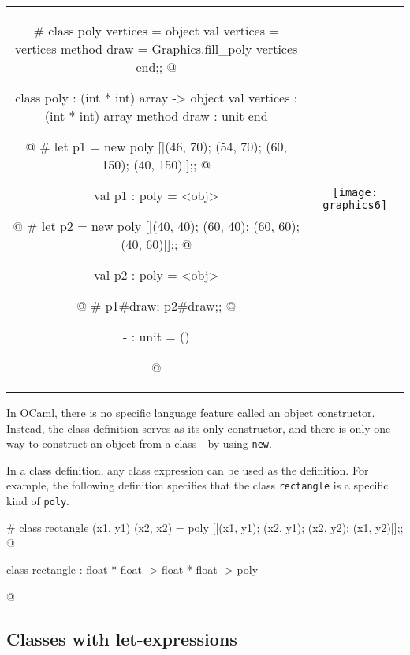 \begin{center}
\begin{tabular}{@{}cc}
\begin{minipage}[b]{3.5in}
\begin{ocamllistingx}
# class poly vertices =
  object
     val vertices = vertices
     method draw = Graphics.fill_poly vertices
  end;;
@
\begin{topoutput}
class poly : (int * int) array ->
  object val vertices : (int * int) array method draw : unit end
\end{topoutput}
@
# let p1 =
     new poly [|(46, 70); (54, 70); (60, 150); (40, 150)|];;
@
\begin{topoutput}
val p1 : poly = <obj>
\end{topoutput}
@
# let p2 = new poly [|(40, 40); (60, 40); (60, 60); (40, 60)|];;
@
\begin{topoutput}
val p2 : poly = <obj>
\end{topoutput}
@
# p1#draw; p2#draw;;
@
\begin{topoutput}
- : unit = ()
\end{topoutput}
@
\end{ocamllistingx}
\end{minipage}
&
\texttt{[image: graphics6]}
\end{tabular}
\end{center}
%
In OCaml, there is no specific language feature called an object constructor.  Instead, the class
definition serves as its only constructor, and there is only one way to construct an object from a
class---by using \hbox{\lstinline/new/}.

In a class definition, any class expression can be used as the definition.  For example, the
following definition specifies that the class \hbox{\lstinline/rectangle/} is a specific kind
of \hbox{\lstinline/poly/}.

\begin{ocaml}
# class rectangle (x1, y1) (x2, x2) =
     poly [|(x1, y1); (x2, y1); (x2, y2); (x1, y2)|];;
@
\begin{topoutput}
class rectangle : float * float -> float * float -> poly
\end{topoutput}
@
\end{ocaml}

\subsection{Classes with let-expressions}

